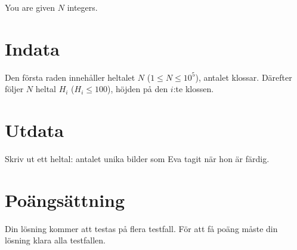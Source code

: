 You are given $N$ integers. 

\section*{Indata}
Den första raden innehåller heltalet $N$ ($1 \leq N \leq 10^5$), antalet klossar.
Därefter följer $N$ heltal $H_i$ ($H_i \leq 100$), höjden på den $i$:te klossen.
\section*{Utdata}
Skriv ut ett heltal: antalet unika bilder som Eva tagit när hon är färdig.

\section*{Poängsättning}
Din lösning kommer att testas på flera testfall.
För att få poäng måste din lösning klara alla testfallen.
